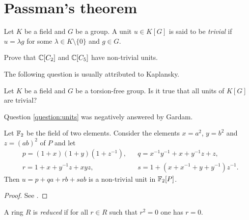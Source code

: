 \section{Passman's theorem}
\label{section:Passman}


Let $K$ be a field and $G$ be a group. A unit $u\in K[G]$ is said
to be \emph{trivial} if $u=\lambda g$ for some $\lambda\in K\setminus\{0\}$ and
$g\in G$.

\begin{exercise}
\label{xca:non_trivial:C2andC5}
        Prove that $\mathbb{C}[C_2]$ and $\mathbb{C}[C_5]$ have non-trivial units.
\end{exercise}

The following question is usually attributed to Kaplansky.

\begin{question}
        \label{question:units}
        Let $K$ be a field and $G$ be a torsion-free group. Is it true that all
        units of $K[G]$ are
        trivial?
\end{question}

Question \ref{question:units} was negatively answered by Gardam.

\begin{graybox}
  \project
  \begin{theorem}[Gardam]
    \label{thm:Gardam_char2}
    Let $\mathbb{F}_2$ be the field of two elements. Consider the elements
    $x=a^2$, $y=b^2$ and $z=(ab)^2$ of $P$ and let
    \begin{align*}
        &p=(1+x)(1+y)(1+z^{-1}),
        &&q = x^{-1}y^{-1}+x+y^{-1}z+z,\\
        &r = 1+x+y^{-1}z+xyz,
        &&s=1+(x+x^{-1}+y+y^{-1})z^{-1}.
    \end{align*}
    Then $u=p+qa+rb+sab$ is a non-trivial unit in $\mathbb{F}_2[P]$.
  \end{theorem}

  \begin{proof}
    See \cite{MR4334981}.
  \end{proof}
\end{graybox}

\begin{definition}
A ring $R$ is \emph{reduced} if for all $r\in R$ such that 
$r^2=0$ one has $r=0$.
\end{definition}

